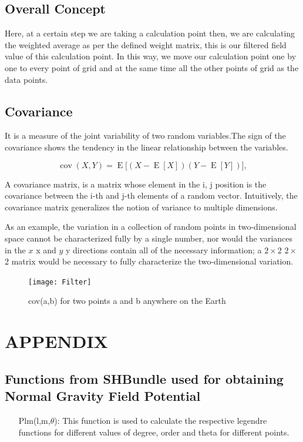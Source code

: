 \documentclass[a4paper,12pt]{report}
\begin{document}
\section{Overall Concept}
 Here, at a certain step we are taking a calculation point then, we are calculating the weighted average as per the defined weight matrix, this is our filtered field value of this calculation point. In this way, we move our calculation point one by one to every point of grid and at the same time all the other points of grid as the data points.     
 
 
\section{Covariance}
It is a measure of the joint variability of two random variables.The sign of the covariance shows the tendency in the linear relationship between the variables.
 

$$
{\displaystyle \operatorname {cov} (X,Y)=\operatorname {E} {{\big [}(X-\operatorname {E} [X])(Y-\operatorname {E} [Y]){\big ]}},} 
$$

 A covariance matrix, is a matrix whose element in the i, j position is the covariance between the i-th and j-th elements of a random vector.
 Intuitively, the covariance matrix generalizes the notion of variance to multiple dimensions.
 
 As an example, the variation in a collection of random points in two-dimensional space cannot be characterized fully by a single number, nor would the variances in the ${\displaystyle x}$ x and $ {\displaystyle y}$ y directions contain all of the necessary information; a ${\displaystyle 2\times 2}$ $ 2\times$ 2 matrix would be necessary to fully characterize the two-dimensional variation.

\begin{figure}[!h]
	\advance\leftskip-3cm
    \texttt{[image: Filter]}
    \caption{cov(a,b) for two points a and b anywhere on the Earth}
\end{figure}

\chapter{APPENDIX}

\section{Functions from SHBundle used for obtaining Normal Gravity Field Potential}
\begin{itemize}
	\item[Plm(l,m,$\theta$): ] This function is used to calculate the respective legendre functions for different values of degree, order and theta for different points.
\end{itemize}
\end{document}
